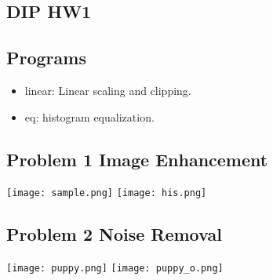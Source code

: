 \documentclass[12pt]{article}
\newcommand{\ul}[1]{\begin{itemize}#1\end{itemize}}
\begin{document}
\begin{CJK*}{Bg5}{bkai}
\section*{DIP HW1}

\subsection*{Programs}
\ul{
  \item {linear: Linear scaling and clipping.}
  \item {eq: histogram equalization.}
}

\subsection*{Problem 1 Image Enhancement}
\texttt{[image: sample.png]}
\texttt{[image: his.png]}

\subsection*{Problem 2 Noise Removal}
\texttt{[image: puppy.png]}
\texttt{[image: puppy\_o.png]}

\newpage
\end{CJK*}
\end{document}
